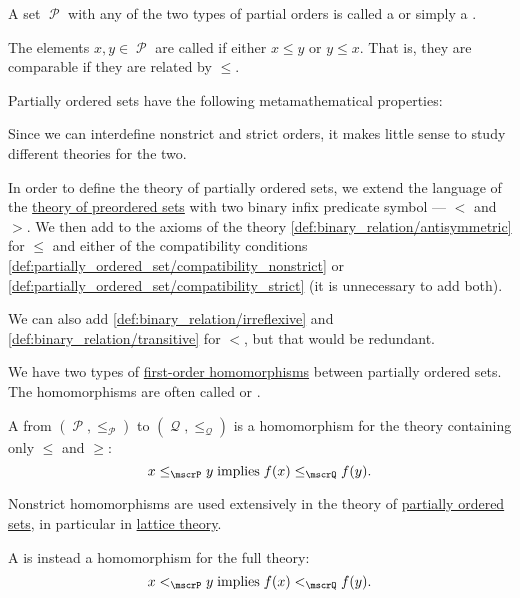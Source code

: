 \begin{definition}
  A set \( \mscrP \) with any of the two types of partial orders is called a  or simply a .

  The elements \( x, y \in \mscrP \) are called  if either \( x \leq y \) or \( y \leq x \). That is, they are comparable if they are related by \( \leq \).

  Partially ordered sets have the following metamathematical properties:
  \begin{thmenum}[resume=def:partially_ordered_set]
     Since we can interdefine nonstrict and strict orders, it makes little sense to study different theories for the two.

    In order to define the theory of partially ordered sets, we extend the language of the \hyperref[def:preordered_set/theory]{theory of preordered sets} with two binary infix predicate symbol --- \( < \) and \( > \). We then add to the axioms of the theory \eqref{def:binary_relation/antisymmetric} for \( \leq \) and either of the compatibility conditions \eqref{def:partially_ordered_set/compatibility_nonstrict} or \eqref{def:partially_ordered_set/compatibility_strict} (it is unnecessary to add both).

    We can also add \eqref{def:binary_relation/irreflexive} and \eqref{def:binary_relation/transitive} for \( < \), but that would be redundant.

     We have two types of \hyperref[def:first_order_homomorphism]{first-order homomorphisms} between partially ordered sets. The homomorphisms are often called  or .

    A  from \( (\mscrP, \leq_\mscrP) \) to \( (\mscrQ, \leq_\mscrQ) \) is a homomorphism for the theory containing only \( \leq \) and \( \geq \):
    \begin{equation}\label{eq:def:partially_ordered_set/homomorphism/nonstrict}
      x \leq_\mscrP y \T{implies} f(x) \leq_\mscrQ f(y).
    \end{equation}

    Nonstrict homomorphisms are used extensively in the theory of \hyperref[subsec:partially_ordered_sets]{partially ordered sets}, in particular in \hyperref[subsec:lattices]{lattice theory}.

    A  is instead a homomorphism for the full theory:
    \begin{equation}\label{eq:def:partially_ordered_set/homomorphism/strict}
      x <_\mscrP y \T{implies} f(x) <_\mscrQ f(y).
    \end{equation}


\end{thmenum}
\end{definition}

